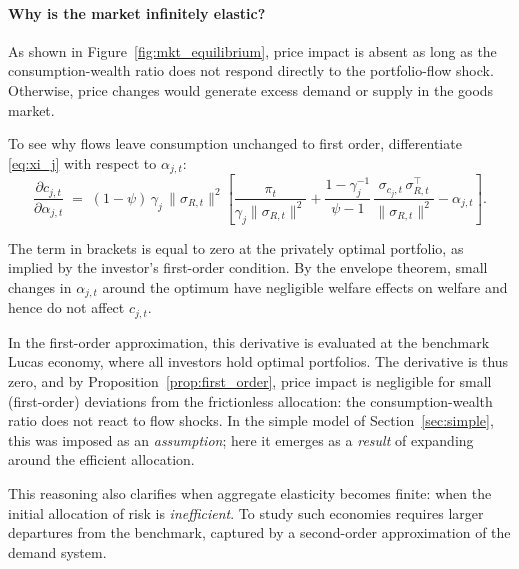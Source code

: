 \paragraph{Why is the market infinitely elastic?}  
As shown in Figure~\ref{fig:mkt_equilibrium}, price impact is absent as long as the consumption-wealth ratio does not respond directly to the portfolio-flow shock. Otherwise, price changes would generate excess demand or supply in the goods market.

To see why flows leave consumption unchanged to first order, differentiate \eqref{eq:xi_j} with respect to $\alpha_{j,t}$:
\begin{equation}
    \frac{\partial c_{j,t}}{\partial \alpha_{j,t}}
    \;=\;
    (1-\psi)\,\gamma_j\,\|\sigma_{R,t}\|^2
    \left[
        \frac{\pi_t}{\gamma_j \|\sigma_{R,t}\|^2}
        + \frac{1-\gamma_j^{-1}}{\psi-1}\,
          \frac{\sigma_{c_j,t}\,\sigma_{R,t}^\top}{\|\sigma_{R,t}\|^2}
        - \alpha_{j,t}
    \right]\!.
\end{equation}

The term in brackets is equal to zero at the privately optimal portfolio, as implied by the investor’s first-order condition. By the envelope theorem, small changes in $\alpha_{j,t}$ around the optimum have negligible welfare effects on welfare and hence do not affect $c_{j,t}$.    

In the first-order approximation, this derivative is evaluated at the benchmark Lucas economy, where all investors hold optimal portfolios. The derivative is thus zero, and by Proposition~\ref{prop:first_order}, price impact is negligible for small (first-order) deviations from the frictionless allocation: the consumption-wealth ratio does not react to flow shocks. In the simple model of Section~\ref{sec:simple}, this was imposed as an \emph{assumption}; here it emerges as a \emph{result} of expanding around the efficient allocation.

This reasoning also clarifies when aggregate elasticity becomes finite: when the initial allocation of risk is \textit{inefficient}. To study such economies requires larger departures from the benchmark, captured by a second-order approximation of the demand system.



